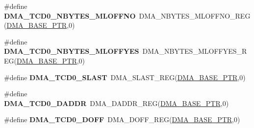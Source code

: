 \begin{DoxyCompactItemize}
\item 
\hypertarget{group___d_m_a___register___accessor___macros_ga442f8530b6e3de8a52be316ad67f398a}{}\#define {\bfseries D\+M\+A\+\_\+\+T\+C\+D0\+\_\+\+N\+B\+Y\+T\+E\+S\+\_\+\+M\+L\+O\+F\+F\+N\+O}~D\+M\+A\+\_\+\+N\+B\+Y\+T\+E\+S\+\_\+\+M\+L\+O\+F\+F\+N\+O\+\_\+\+R\+E\+G(\hyperlink{group___d_m_a___peripheral_ga6997fbc1b1973e9f27170217a3bd6f22}{D\+M\+A\+\_\+\+B\+A\+S\+E\+\_\+\+P\+T\+R},0)\label{group___d_m_a___register___accessor___macros_ga442f8530b6e3de8a52be316ad67f398a}

\item 
\hypertarget{group___d_m_a___register___accessor___macros_gac8d4550b098b51609522217ce553a037}{}\#define {\bfseries D\+M\+A\+\_\+\+T\+C\+D0\+\_\+\+N\+B\+Y\+T\+E\+S\+\_\+\+M\+L\+O\+F\+F\+Y\+E\+S}~D\+M\+A\+\_\+\+N\+B\+Y\+T\+E\+S\+\_\+\+M\+L\+O\+F\+F\+Y\+E\+S\+\_\+\+R\+E\+G(\hyperlink{group___d_m_a___peripheral_ga6997fbc1b1973e9f27170217a3bd6f22}{D\+M\+A\+\_\+\+B\+A\+S\+E\+\_\+\+P\+T\+R},0)\label{group___d_m_a___register___accessor___macros_gac8d4550b098b51609522217ce553a037}

\item 
\hypertarget{group___d_m_a___register___accessor___macros_ga5e23f24daf65d1eb0e6839272544261a}{}\#define {\bfseries D\+M\+A\+\_\+\+T\+C\+D0\+\_\+\+S\+L\+A\+S\+T}~D\+M\+A\+\_\+\+S\+L\+A\+S\+T\+\_\+\+R\+E\+G(\hyperlink{group___d_m_a___peripheral_ga6997fbc1b1973e9f27170217a3bd6f22}{D\+M\+A\+\_\+\+B\+A\+S\+E\+\_\+\+P\+T\+R},0)\label{group___d_m_a___register___accessor___macros_ga5e23f24daf65d1eb0e6839272544261a}

\item 
\hypertarget{group___d_m_a___register___accessor___macros_gaaa3f8d47687e097095364c5ecccf58c9}{}\#define {\bfseries D\+M\+A\+\_\+\+T\+C\+D0\+\_\+\+D\+A\+D\+D\+R}~D\+M\+A\+\_\+\+D\+A\+D\+D\+R\+\_\+\+R\+E\+G(\hyperlink{group___d_m_a___peripheral_ga6997fbc1b1973e9f27170217a3bd6f22}{D\+M\+A\+\_\+\+B\+A\+S\+E\+\_\+\+P\+T\+R},0)\label{group___d_m_a___register___accessor___macros_gaaa3f8d47687e097095364c5ecccf58c9}

\item 
\hypertarget{group___d_m_a___register___accessor___macros_ga660879131747c3bd7f21daa0a826b016}{}\#define {\bfseries D\+M\+A\+\_\+\+T\+C\+D0\+\_\+\+D\+O\+F\+F}~D\+M\+A\+\_\+\+D\+O\+F\+F\+\_\+\+R\+E\+G(\hyperlink{group___d_m_a___peripheral_ga6997fbc1b1973e9f27170217a3bd6f22}{D\+M\+A\+\_\+\+B\+A\+S\+E\+\_\+\+P\+T\+R},0)\label{group___d_m_a___register___accessor___macros_ga660879131747c3bd7f21daa0a826b016}


\end{DoxyCompactItemize}
